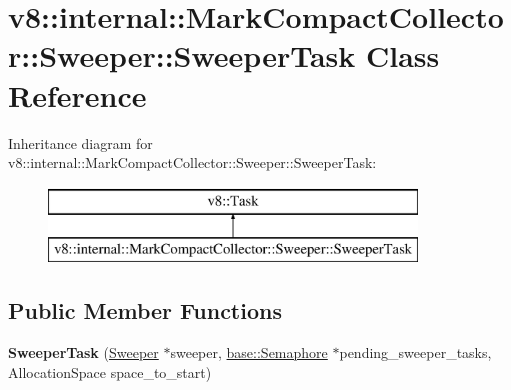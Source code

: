 \hypertarget{classv8_1_1internal_1_1_mark_compact_collector_1_1_sweeper_1_1_sweeper_task}{}\section{v8\+:\+:internal\+:\+:Mark\+Compact\+Collector\+:\+:Sweeper\+:\+:Sweeper\+Task Class Reference}
\label{classv8_1_1internal_1_1_mark_compact_collector_1_1_sweeper_1_1_sweeper_task}
Inheritance diagram for v8\+:\+:internal\+:\+:Mark\+Compact\+Collector\+:\+:Sweeper\+:\+:Sweeper\+Task\+:\begin{figure}[H]
\begin{center}
\leavevmode
\includegraphics[height=2.000000cm]{classv8_1_1internal_1_1_mark_compact_collector_1_1_sweeper_1_1_sweeper_task}
\end{center}
\end{figure}
\subsection*{Public Member Functions}
\begin{DoxyCompactItemize}
\item 
{\bfseries Sweeper\+Task} (\hyperlink{classv8_1_1internal_1_1_mark_compact_collector_1_1_sweeper}{Sweeper} $\ast$sweeper, \hyperlink{classv8_1_1base_1_1_semaphore}{base\+::\+Semaphore} $\ast$pending\+\_\+sweeper\+\_\+tasks, Allocation\+Space space\+\_\+to\+\_\+start)\hypertarget{classv8_1_1internal_1_1_mark_compact_collector_1_1_sweeper_1_1_sweeper_task_ae24a1f71c96c9d7742416dcf7e933ec8}{}\label{classv8_1_1internal_1_1_mark_compact_collector_1_1_sweeper_1_1_sweeper_task_ae24a1f71c96c9d7742416dcf7e933ec8}

\end{DoxyCompactItemize}
